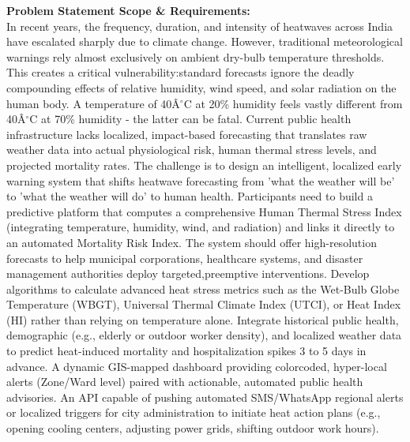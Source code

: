 \documentclass[10pt,a4paper]{article}
\begin{document}
\begin{tcolorbox}[pscard, title={"\textbf{SIH26083} \quad $\vert$ \quad Extreme Heatwave Early Warning and Human Thermal Stress Index}]
\textbf{\color{sihnavy}Problem Statement Scope \& Requirements:}\\[0.15cm]
\noindent\small In recent years, the frequency, duration, and intensity of heatwaves across India have escalated sharply due to climate change. However, traditional meteorological warnings rely almost exclusively on ambient dry-bulb temperature thresholds. This creates a critical vulnerability:standard forecasts ignore the deadly compounding effects of relative humidity, wind speed, and solar radiation on the human body. A temperature of 40Â$^\circ$C at 20\% humidity feels vastly different from 40Â$^\circ$C at 70\% humidity - the latter can be fatal. Current public health infrastructure lacks localized, impact-based forecasting that translates raw weather data into actual physiological risk, human thermal stress levels, and projected mortality rates. The challenge is to design an intelligent, localized early warning system that shifts heatwave forecasting from 'what the weather will be' to 'what the weather will do' to human health. Participants need to build a predictive platform that computes a comprehensive Human Thermal Stress Index (integrating temperature, humidity, wind, and radiation) and links it directly to an automated Mortality Risk Index. The system should offer high-resolution forecasts to help municipal corporations, healthcare systems, and disaster management authorities deploy targeted,preemptive interventions. Develop algorithms to calculate advanced heat stress metrics such as the Wet-Bulb Globe Temperature (WBGT), Universal Thermal Climate Index (UTCI), or Heat Index (HI) rather than relying on temperature alone. Integrate historical public health, demographic (e.g., elderly or outdoor worker density), and localized weather data to predict heat-induced mortality and hospitalization spikes 3 to 5 days in advance. A dynamic GIS-mapped dashboard providing colorcoded, hyper-local alerts (Zone/Ward level) paired with actionable, automated public health advisories. An API capable of pushing automated SMS/WhatsApp regional alerts or localized triggers for city administration to initiate heat action plans (e.g., opening cooling centers, adjusting power grids, shifting outdoor work hours).\par\vspace{0.06cm}

\end{tcolorbox}
\vspace{0.4cm}
{}
\end{document}
